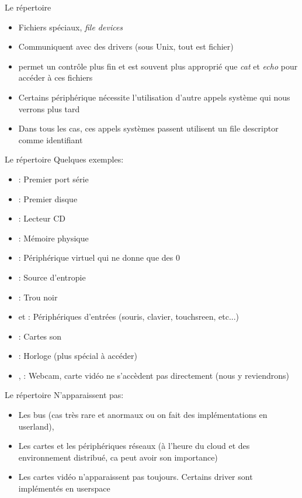 \begin{frame}[fragile=singleslide]{Le répertoire }
  \begin{itemize}
  \item Fichiers spéciaux, \emph{file devices}
  \item Communiquent avec des drivers (sous Unix, tout est fichier)
  \item {}  permet un contrôle  plus fin et est  souvent plus
    approprié  que  \emph{cat}  et  \emph{echo}  pour  accéder  à  ces
    fichiers
  \item Certains  périphérique nécessite l'utilisation  d'autre appels
    système qui nous verrons plus tard
  \item Dans  tous les cas,  ces appels systèmes passent  utilisent un
    file descriptor comme identifiant
  \end{itemize}
\end{frame}

\begin{frame}[fragile=singleslide]{Le répertoire }
  Quelques exemples:
  \begin{itemize}
  \item {}: Premier port série
  \item {}: Premier disque
  \item {}: Lecteur CD
  \item {}: Mémoire physique
  \item {}: Périphérique virtuel qui ne donne que des 0
  \item {}: Source d'entropie
  \item {}: Trou noir
  \item   {}   et  :   Périphériques
    d'entrées (souris, clavier, touchsreen, etc...)
  \item {}: Cartes son
  \item {}: Horloge (plus spécial à accéder)
  \item {}, : Webcam, carte vidéo ne
    s'accèdent pas directement (nous y reviendrons)
  \end{itemize}
\end{frame}

\begin{frame}[fragile=singleslide]{Le répertoire }
  N'apparaissent pas:
  \begin{itemize}
  \item Les bus (cas très rare et anormaux ou on fait des implémentations
    en userland),
  \item Les cartes  et les périphériques réseaux (à  l'heure du cloud et
    des environnement distribué, ca peut avoir son importance)
  \item  Les cartes  vidéo n'apparaissent  pas toujours.  Certains driver
    sont implémentés en userspace
  \end{itemize}
\end{frame}


